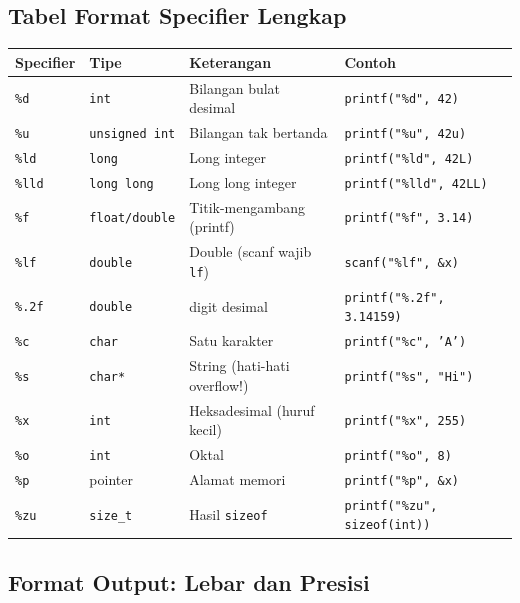 \documentclass[../main.tex]{subfiles}
\begin{document}
\subsection{Tabel Format Specifier Lengkap}

{\small
\setlength{\tabcolsep}{3pt}
\begin{tabularx}{\textwidth}{@{}|>{\raggedright\arraybackslash}p{2.2cm}|>{\raggedright\arraybackslash}p{2.5cm}|>{\raggedright\arraybackslash}p{4.8cm}|>{\raggedright\arraybackslash}X|@{}}
\hline
\textbf{Specifier} & \textbf{Tipe} & \textbf{Keterangan} & \textbf{Contoh} \\
\hline
\texttt{\%d} & \texttt{int} & Bilangan bulat desimal & \texttt{printf("\%d", 42)} \\
\hline
\texttt{\%u} & \texttt{unsigned int} & Bilangan tak bertanda & \texttt{printf("\%u", 42u)} \\
\hline
\texttt{\%ld} & \texttt{long} & Long integer & \texttt{printf("\%ld", 42L)} \\
\hline
\texttt{\%lld} & \texttt{long long} & Long long integer & \texttt{printf("\%lld", 42LL)} \\
\hline
\texttt{\%f} & \texttt{float/double} & Titik-mengambang (printf) & \texttt{printf("\%f", 3.14)} \\
\hline
\texttt{\%lf} & \texttt{double} & Double (scanf wajib \texttt{lf}) & \texttt{scanf("\%lf", \&x)} \\
\hline
\texttt{\%.2f} & \texttt{double} & 2 digit desimal & \texttt{printf("\%.2f", 3.14159)} \\
\hline
\texttt{\%c} & \texttt{char} & Satu karakter & \texttt{printf("\%c", 'A')} \\
\hline
\texttt{\%s} & \texttt{char*} & String (hati-hati overflow!) & \texttt{printf("\%s", "Hi")} \\
\hline
\texttt{\%x} & \texttt{int} & Heksadesimal (huruf kecil) & \texttt{printf("\%x", 255)} \\
\hline
\texttt{\%o} & \texttt{int} & Oktal & \texttt{printf("\%o", 8)} \\
\hline
\texttt{\%p} & pointer & Alamat memori & \texttt{printf("\%p", \&x)} \\
\hline
\texttt{\%zu} & \texttt{size\_t} & Hasil \texttt{sizeof} & \texttt{printf("\%zu", sizeof(int))} \\
\hline
\end{tabularx}%
}

\subsection{Format Output: Lebar dan Presisi}
\end{document}

